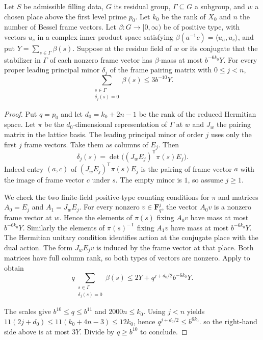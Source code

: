 \begin{lemma}
\label{lem:b-leading-minor}
\emitthmsource
Let $S$ be admissible filling data, $G$ its residual group, $\Gamma\subseteq G$ a subgroup, and $w$ a chosen place above
the first level prime $p_0$. Let $k_0$ be the rank of $X_0$ and $n$ the number of Bessel frame vectors.
Let $\beta:G\to[0,\infty)$ be of positive type, with vectors $u_s$ in a complex inner product space
satisfying $\beta(a^{-1}c)=\langle u_a,u_c\rangle$, and put $Y=\sum_{s\in\Gamma}\beta(s)$.
Suppose at the residue field of $w$ or its conjugate that the stabilizer in $\Gamma$ of each nonzero frame vector
has $\beta$-mass at most $b^{-6k_0}Y$.
For every proper leading principal minor $\delta_j$ of the frame pairing matrix with $0\le j<n$,
\[
 \sum_{\substack{s\in\Gamma\\\delta_j(s)=0}}\beta(s)\le 3b^{-10}Y .
\]
\end{lemma}
\begin{proof}
Put $q=p_0$ and let $d_0=k_0+2n-1$ be the rank of the reduced Hermitian space.
Let $\pi$ be the $d_0$-dimensional representation of $\Gamma$ at $w$ and $J_w$ the pairing matrix in the lattice basis.
The leading principal minor of order $j$ uses only the first $j$ frame vectors.
Take them as columns of $E_j$. Then
\[
 \delta_j(s)=\det\bigl((J_w E_j)^{\mathsf T}\pi(s)E_j\bigr).
\]
Indeed entry $(a,c)$ of $(J_w E_j)^{\mathsf T}\pi(s)E_j$
is the pairing of frame vector $a$ with the image of frame vector $c$ under $s$.
The empty minor is $1$, so assume $j\ge1$.

We check the two finite-field positive-type counting conditions for $\pi$ and matrices
$A_0=E_j$ and $A_1=J_wE_j$.
For every nonzero $v\in\mathbf F_q^j$, the vector $A_0v$ is a nonzero frame vector at $w$.
Hence the elements of $\pi(s)$ fixing $A_0v$ have mass at most $b^{-6k_0}Y$.
Similarly the elements of $\pi(s)^{-\mathsf T}$ fixing $A_1v$ have mass at most $b^{-6k_0}Y$.
The Hermitian unitary condition identifies action at the conjugate place with the dual action.
The form $J_wE_jv$ is induced by the frame vector at that place.
Both matrices have full column rank, so both types of vectors are nonzero.
Apply  to obtain
\[
 q\sum_{\substack{s\in\Gamma\\\delta_j(s)=0}}\beta(s)
   \le 2Y+q^{j+d_0/2}b^{-6k_0}Y .
\]

The scales give $b^{10}\le q\le b^{11}$ and $2000n\le k_0$.
Using $j<n$ yields
$11(2j+d_0)\le11(k_0+4n-3)\le12k_0$,
hence $q^{j+d_0/2}\le b^{6k_0}$.
so the right-hand side above is at most $3Y$. Divide by $q\ge b^{10}$ to conclude.
\end{proof}

